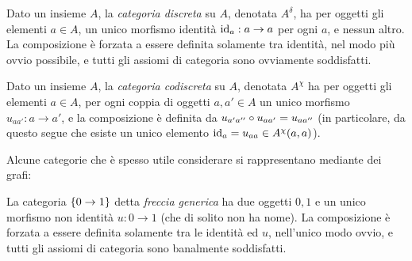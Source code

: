 \begin{example}\label{ex_cat_discreta}
	Dato un insieme \(A\), la \emph{categoria discreta} su \(A\), denotata \(A^\delta\), ha per oggetti gli elementi \(a\in A\), un unico morfismo identità \(\mathrm{id}_a : a\to a\) per ogni \(a\), e nessun altro. La composizione è forzata a essere definita solamente tra identità, nel modo più ovvio possibile, e tutti gli assiomi di categoria sono ovviamente soddisfatti.
\end{example}
\begin{example}\label{ex_cat_codiscreta}
	Dato un insieme \(A\), la \emph{categoria codiscreta} su \(A\), denotata \(A^\chi\) ha per oggetti gli elementi \(a\in A\), per ogni coppia di oggetti \(a,a'\in A\) un unico morfismo \(u_{aa'}:a\to a'\), e la composizione è definita da \(u_{a'a''}\circ u_{aa'}=u_{aa''}\) (in particolare, da questo segue che esiste un unico elemento \(\mathrm{id}_a=u_{aa}\in A^\chi(a,a)\)).
\end{example}
Alcune categorie che è spesso utile considerare si rappresentano mediante dei grafi:
\begin{example}\label{ex_cat_freccia}
	La categoria \(\{0\to 1\}\) detta \emph{freccia generica} ha due oggetti \(0,1\) e un unico morfismo non identità \(u : 0\to 1\) (che di solito non ha nome). La composizione è forzata a essere definita solamente tra le identità ed \(u\), nell'unico modo ovvio, e tutti gli assiomi di categoria sono banalmente soddisfatti.
\end{example}
